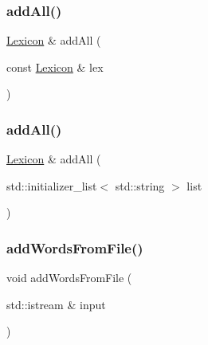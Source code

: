 \subsubsection{\texorpdfstring{add\+All()}{addAll()}\hspace{0.1cm}{\footnotesize\ttfamily [1/2]}}
{\footnotesize\ttfamily \mbox{\hyperlink{classLexicon}{Lexicon}} \& add\+All (\begin{DoxyParamCaption}\item[{const \mbox{\hyperlink{classLexicon}{Lexicon}} \&}]{lex }\end{DoxyParamCaption})}

\mbox{\label{classLexicon_a554e59039648403990042d16710855e0}} 
\subsubsection{\texorpdfstring{add\+All()}{addAll()}\hspace{0.1cm}{\footnotesize\ttfamily [2/2]}}
{\footnotesize\ttfamily \mbox{\hyperlink{classLexicon}{Lexicon}} \& add\+All (\begin{DoxyParamCaption}\item[{std\+::initializer\+\_\+list$<$ std\+::string $>$}]{list }\end{DoxyParamCaption})}

\mbox{\label{classLexicon_a215fcead487aace2e89b04863e326ba6}} 
\subsubsection{\texorpdfstring{add\+Words\+From\+File()}{addWordsFromFile()}\hspace{0.1cm}{\footnotesize\ttfamily [1/2]}}
{\footnotesize\ttfamily void add\+Words\+From\+File (\begin{DoxyParamCaption}\item[{std\+::istream \&}]{input }\end{DoxyParamCaption})}

\mbox{\label{classLexicon_a3891deaa85aee9a52b6ca258d1514716}} 
